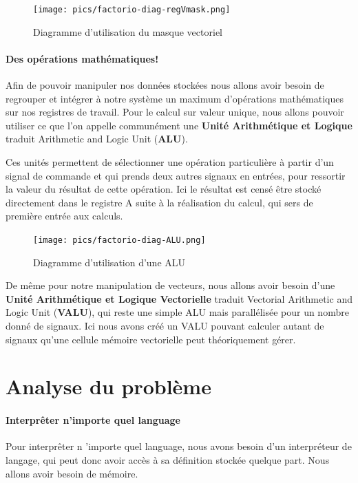 \documentclass{scrreprt}
\begin{document}
	    	
	    	\begin{figure}[h]
	    		\centering
	    		\texttt{[image: pics/factorio-diag-regVmask.png]}
	    		
	    		\caption{Diagramme d'utilisation du masque vectoriel}
	    	\end{figure}
	    	
	    	\paragraph{Des opérations mathématiques!}
	    	Afin de pouvoir manipuler nos données stockées nous allons avoir besoin de regrouper et intégrer à notre système un maximum d'opérations mathématiques sur nos registres de travail.
	    	Pour le calcul sur valeur unique, nous allons pouvoir utiliser ce que l'on appelle communément une \textbf{Unité Arithmétique et Logique} traduit Arithmetic and Logic Unit (\textbf{ALU}).
	    	
	    	Ces unités permettent de sélectionner une opération particulière à partir d'un signal de commande et qui prends deux autres signaux en entrées, pour ressortir la valeur du résultat de cette opération.
	    	Ici le résultat est censé être stocké directement dans le registre A suite à la réalisation du calcul, qui sers de première entrée aux calculs.
	    	
	    	\begin{figure}[h]
	    		\centering
	    		\texttt{[image: pics/factorio-diag-ALU.png]}
	    		
	    		\caption{Diagramme d'utilisation d'une ALU}
	    	\end{figure}
	    	
	    	De même pour notre manipulation de vecteurs, nous allons avoir besoin d'une \textbf{Unité Arithmétique et Logique Vectorielle} traduit Vectorial Arithmetic and Logic Unit (\textbf{VALU}), qui reste une simple ALU mais parallélisée pour un nombre donné de signaux.
	    	Ici nous avons créé un VALU pouvant calculer autant de signaux qu'une cellule mémoire vectorielle peut théoriquement gérer. 
	    	
	    	
	     
	    
	    \section{Analyse du problème}
	    
		
	    
	    
	    	\paragraph{Interprêter n'importe quel language}
	    	Pour interprêter n 'importe quel language, nous avons besoin d'un interpréteur de langage, qui peut donc avoir accès à sa définition stockée quelque part. Nous allons avoir besoin de mémoire. 
	    	
\end{document}
